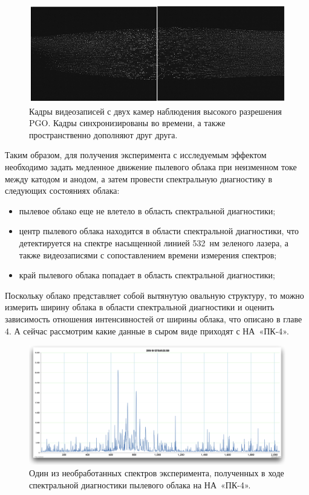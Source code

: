 \begin{figure}[t]
  \centering
  \includegraphics[width=16cm]{figures/high_resolution_cameras}
  \caption{Кадры видеозаписей с двух камер наблюдения высокого разрешения PGO. Кадры синхронизированы во времени, а также пространственно дополняют друг друга.}
  \label{fig:high_resolution_cameras}
\end{figure}

Таким образом, для получения эксперимента с исследуемым эффектом необходимо задать медленное движение пылевого облака при
неизменном токе между катодом и анодом, а затем провести спектральную диагностику в следующих состояниях облака:
\begin{itemize}
\item пылевое облако еще не влетело в область спектральной диагностики;
\item центр пылевого облака находится в области спектральной диагностики, что детектируется на спектре насыщенной
линией 532~нм зеленого лазера, а также видеозаписями с сопоставлением времени измерения спектров;
\item край пылевого облака попадает в область спектральной диагностики;
\end{itemize}

Поскольку облако представляет собой вытянутую овальную структуру, то можно измерить ширину облака в области спектральной диагностики
и оценить зависимость отношения интенсивностей от ширины облака, что описано в главе 4. А сейчас рассмотрим какие данные
в сыром виде приходят с НА~«ПК-4».

\begin{figure}[t]
  \centering
  \includegraphics[width=16cm]{figures/raw_spectrum}
  \caption{Один из необработанных спектров эксперимента, полученных в ходе спектральной диагностики пылевого облака на НА~«ПК-4».}
  \label{fig:raw_spectrum}
\end{figure}

